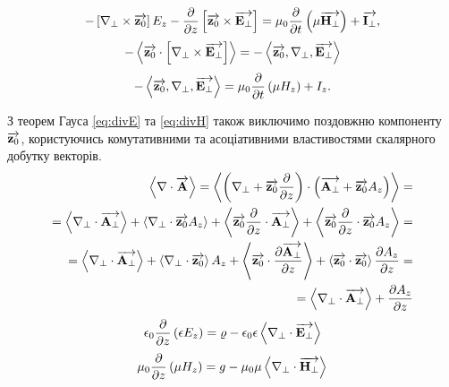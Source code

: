 %
\begin{equation} \label{eq:rotEt} 
- \crossprod{\nabla_\perp}{\vect{z_0}} E_z -
\partder{}{z} \crossprod{\vect{z_0}}{\vect{E_\perp}} = 
\mu_0 \partder{}{t} \left( \mu  \vect{H_\perp} \right) + \vect{I_\perp},
\end{equation}
%
\textcolor{blue}{ \begin{equation*} \begin{aligned}
- \dotprod{\vect{z_0}}{\crossprod{\nabla_\perp}{\vect{E_\perp}}} = 
- \triple{\vect{z_0}}{\nabla_\perp}{\vect{E_\perp}}
\end{aligned} \end{equation*} }
%
\begin{equation} \label{eq:rotEz}
- \triple{\vect{z_0}}{\nabla_\perp}{\vect{E_\perp}} =
\mu_0 \partder{}{t} \left(\mu H_z \right) + I_z.
\end{equation}

З теорем Гауса \eqref{eq:divE} та \eqref{eq:divH} також виключимо 
поздовжню компоненту $ \vect{z_0} $, користуючись комутативними та 
асоціативними властивостями скалярного добутку векторів.
%
\textcolor{blue}{ \begin{equation*} \begin{aligned}
\dotprod{\nabla}{\vect{A}} = \dotprod
{\left( \nabla_\perp + \vect{z_0} \partder{}{z} \right)}
{\left( \vect{A_\perp} + \vect{z_0} A_z \right)} = \\
= \dotprod{\nabla_\perp}{\vect{A_\perp}} + 
\dotprod{\nabla_\perp}{\vect{z_0} A_z}  +
\dotprod{\vect{z_0} \partder{}{z}}{\vect{A_\perp}} +
\dotprod{\vect{z_0} \partder{}{z}}{\vect{z_0} A_z} = \\
= \dotprod{\nabla_\perp}{\vect{A_\perp}} +
\dotprod{\nabla_\perp}{\vect{z_0}} A_z +
\dotprod{\vect{z_0}}{\partder{\vect{A_\perp}}{z}} +
\dotprod{\vect{z_0}}{\vect{z_0}} \partder{A_z}{z} = \\
= \dotprod{\nabla_\perp}{\vect{A_\perp}} + \partder{A_z}{z}
\end{aligned} \end{equation*} }
%
\begin{equation} \label{eq:divEt} 
\epsilon_0 \partder{}{z} \left( \epsilon E_z \right) = 
\varrho - \epsilon_0 \epsilon \dotprod{\nabla_\perp}{\vect{E_\perp}}
\end{equation}
%
\begin{equation} \label{eq:divHt}
\mu_0 \partder{}{z} \left( \mu H_z \right) = 
g - \mu_0 \mu \dotprod{\nabla_\perp}{\vect{H_\perp}}
\end{equation}

